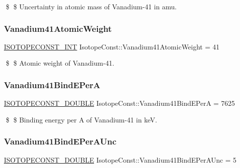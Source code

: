 \$ \$ Uncertainty in atomic mass of Vanadium-\/41 in amu. \mbox{\label{group___isotope_const-_vanadium-_v41_ga61cc276de8a818dcf2b2a471ced41d81}} 
\subsubsection{\texorpdfstring{Vanadium41\+Atomic\+Weight}{Vanadium41AtomicWeight}}
{\footnotesize\ttfamily \mbox{\hyperlink{group___isotope_const-_macros_ga5f18360b3e99483a35c32d789e62621c}{I\+S\+O\+T\+O\+P\+E\+C\+O\+N\+S\+T\+\_\+\+I\+NT}} Isotope\+Const\+::\+Vanadium41\+Atomic\+Weight = 41}

\$ \$ Atomic weight of Vanadium-\/41. \mbox{\label{group___isotope_const-_vanadium-_v41_ga9be521f959495f683f1bf2e099ec5a07}} 
\subsubsection{\texorpdfstring{Vanadium41\+Bind\+E\+PerA}{Vanadium41BindEPerA}}
{\footnotesize\ttfamily \mbox{\hyperlink{group___isotope_const-_macros_ga8f45a7272ce02c0b4c65c44636ed719a}{I\+S\+O\+T\+O\+P\+E\+C\+O\+N\+S\+T\+\_\+\+D\+O\+U\+B\+LE}} Isotope\+Const\+::\+Vanadium41\+Bind\+E\+PerA = 7625}

\$ \$ Binding energy per A of Vanadium-\/41 in keV. \mbox{\label{group___isotope_const-_vanadium-_v41_ga9c269a464f0ddfefeefce9dc6b67dc80}} 
\subsubsection{\texorpdfstring{Vanadium41\+Bind\+E\+Per\+A\+Unc}{Vanadium41BindEPerAUnc}}
{\footnotesize\ttfamily \mbox{\hyperlink{group___isotope_const-_macros_ga8f45a7272ce02c0b4c65c44636ed719a}{I\+S\+O\+T\+O\+P\+E\+C\+O\+N\+S\+T\+\_\+\+D\+O\+U\+B\+LE}} Isotope\+Const\+::\+Vanadium41\+Bind\+E\+Per\+A\+Unc = 5}

